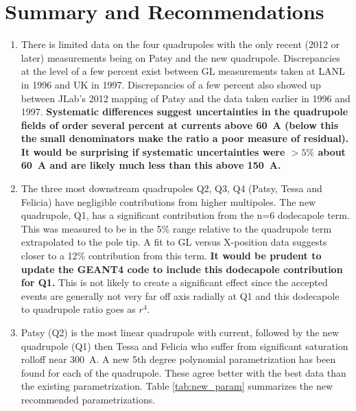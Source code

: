\documentclass[12pt]{article}
\begin{document}
\section{Summary and Recommendations}
\begin{enumerate}
\item{There is limited data on the four quadrupoles with the only recent (2012 or later) measurements being on Patsy and the new quadrupole. Discrepancies at the level of a few percent exist between GL measurements taken at LANL in 1996 and UK in 1997. Discrepancies of a few percent also showed up between JLab's 2012 mapping of Patsy and the data taken earlier in 1996 and 1997. \textbf{Systematic differences suggest uncertainties in the quadrupole fields of order several percent at currents above 60~A (below this the small denominators make the ratio a poor measure of residual). It would be surprising if systematic uncertainties were $>5\%$ about 60~A and are likely much less than this above 150~A. }}
\item{The three most downstream quadrupoles Q2, Q3, Q4 (Patsy, Tessa and Felicia) have negligible contributions from higher multipoles. The new quadrupole, Q1, has a significant contribution from the n=6 dodecapole term. This was measured to be in the 5\% range relative to the quadrupole term extrapolated to the pole tip. A fit to GL versus X-position data suggests closer to a 12\% contribution from this term. \textbf{It would be prudent to update the GEANT4 code to include this dodecapole contribution for Q1.} This is not likely to create a significant effect since the accepted events are generally not very far off axis radially at Q1 and this dodecapole to quadrupole ratio goes as $r^4$.}
\item{Patsy (Q2) is the most linear quadrupole with current, followed by the new quadrupole (Q1) then Tessa and Felicia who suffer from significant saturation rolloff near 300~A. A new 5th degree polynomial parametrization has been found for each of the quadrupole. These agree better with  the best data than the existing parametrization. Table \ref{tab:new_param} summarizes the new recommended parametrizations.}
\end{enumerate}
\end{document}
